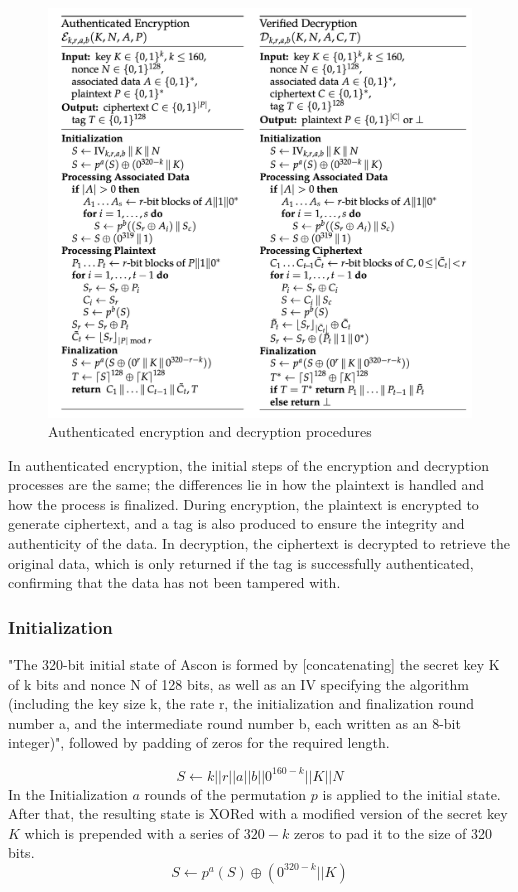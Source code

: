 \begin{figure}[H]
    \centering
    \includegraphics[width=1\textwidth]{figures/alg.png}
    \caption{Authenticated encryption and decryption procedures \cite{Ascon-v1.2}}
    \label{fig:procedure}
\end{figure}

In authenticated encryption, the initial steps of the encryption and decryption processes are the same; the differences lie in how the plaintext is handled and how the process is finalized. During encryption, the plaintext is encrypted to generate ciphertext, and a tag is also produced to ensure the integrity and authenticity of the data. In decryption, the ciphertext is decrypted to retrieve the original data, which is only returned if the tag is successfully authenticated, confirming that the data has not been tampered with. \par

\subsubsection{Initialization}
"The 320-bit initial state of Ascon is formed by [concatenating] the secret key K of k bits and nonce N of 128 bits, as well as an IV specifying the algorithm (including the key size k, the rate r, the initialization and finalization round number a, and the intermediate round number b, each written as an 8-bit integer)", followed by padding of zeros for the required length. \par
$$S \leftarrow k || r || a || b || 0^{160-k} || K || N $$
In the Initialization $a$ rounds of the permutation $p$ is applied to the initial state. After that, the resulting state is XORed with a modified version of the secret key $K$ which is prepended with a series of $320-k$ zeros to pad it to the size of 320 bits. \cite{Ascon-v1.2}
$$S \leftarrow p^a(S) \oplus (0^{320-k} || K)$$


